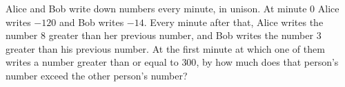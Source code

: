Alice and Bob write down numbers every minute, in unison. At minute $0$ Alice writes $-120$ and Bob writes $-14$. Every minute after that, Alice writes the number $8$ greater than her previous number, and Bob writes the number $3$ greater than his previous number. At the first minute at which one of them writes a number greater than or equal to $300$, by how much does that person's number exceed the other person's number?
